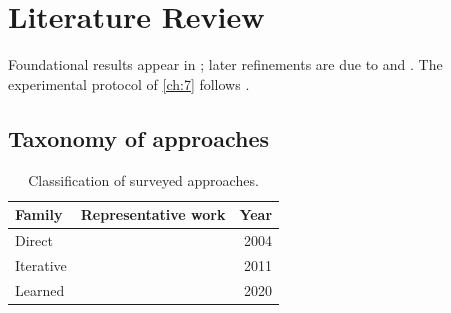 \chapter*{Literature Review}
\lipsum[104-106]

Foundational results appear in \citep{main-1,main-2,main-3}; later refinements are due to \citet{main-4} and \citet{main-5}.
The experimental protocol of \cref{ch:7} follows \cite{main-6,main-7}.

\section*{Taxonomy of approaches}
\lipsum[46-48]

\begin{table}[htbp]\centering
\caption{Classification of surveyed approaches.}\label{tab:review}
\begin{tabular}{llr}\toprule Family & Representative work & Year \\ \midrule
Direct & \citet{main-8} & 2004 \\ Iterative & \citet{main-9} & 2011 \\ Learned & \citet{main-10} & 2020 \\ \bottomrule\end{tabular}
\end{table}
\kant[5-12]


